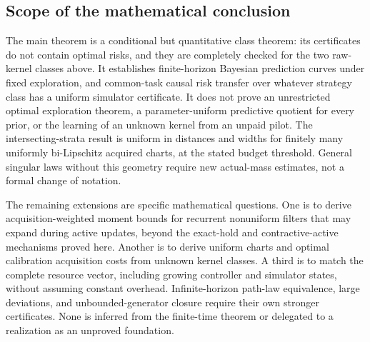 \subsection{Scope of the mathematical conclusion}
The main theorem is a conditional but quantitative class theorem: its certificates do not contain optimal risks, and they are completely checked for the two raw-kernel classes above. It establishes finite-horizon Bayesian prediction curves under fixed exploration, and common-task causal risk transfer over whatever strategy class has a uniform simulator certificate. It does not prove an unrestricted optimal exploration theorem, a parameter-uniform predictive quotient for every prior, or the learning of an unknown kernel from an unpaid pilot. The intersecting-strata result is uniform in distances and widths for finitely many uniformly bi-Lipschitz acquired charts, at the stated budget threshold. General singular laws without this geometry require new actual-mass estimates, not a formal change of notation.

The remaining extensions are specific mathematical questions. One is to derive acquisition-weighted moment bounds for recurrent nonuniform filters that may expand during active updates, beyond the exact-hold and contractive-active mechanisms proved here. Another is to derive uniform charts and optimal calibration acquisition costs from unknown kernel classes. A third is to match the complete resource vector, including growing controller and simulator states, without assuming constant overhead. Infinite-horizon path-law equivalence, large deviations, and unbounded-generator closure require their own stronger certificates. None is inferred from the finite-time theorem or delegated to a realization as an unproved foundation.
